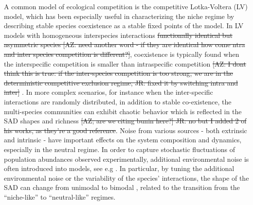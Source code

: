 \documentclass[9pt,twocolumn,twoside,lineno]{pnas-new}
\begin{document}
A common model of ecological competition is the competitive Lotka-Voltera (LV) model, which has been especially useful in characterizing the niche regime by describing stable species coexistence as a stable fixed points of the model.  %
In LV models with homogeneous interspecies interactions \st{functionally identical but asymmetric species [AZ: need another word - if they are identical how come ntra and inter species competition is different?]}, coexistence is typically found when the interspecific competition is smaller than intraspecific competition \st{[AZ: I dont think this is true: if the inter-species competition is too strong, we are in the deterministic competitive exclusion regime, JR: fixed it by switching intra and inter]} \cite{hardin1960competitive,macarthur1967limiting,MacArthur1969species, gause2019struggle}.
In more complex scenarios, for instance when the inter-specific interactions are randomly distributed, in addition to stable co-existence, the multi-species communities can exhibit chaotic behavior which is reflected in the SAD shapes and richness \cite{scheffer2006self,vergnon2012emergent,kessler2015generalized,bunin2016interaction,roy2019can}\st{[AZ; are we citing bunin here?] JR: no but I added 2 of his works, as they're a good reference}. 
Noise from various sources - both extrinsic and intrinsic - have important effects on the system composition and dynamics, especially in the neutral regime. 
In order to capture stochastic fluctuations of population abundances observed experimentally, additional environmental noise is often introduced into models, see e.g \cite{fisher2014transition,lynch2015ecology,verberk2011explaining,fowler2013colonization,barabas2016effect}.
In particular, by tuning the additional environmental noise or the variability of the species' interactions, the shape of the SAD can change from unimodal to bimodal \cite{fisher2014transition}, related to the transition from the ``niche-like'' to ``neutral-like'' regimes.
\end{document}
